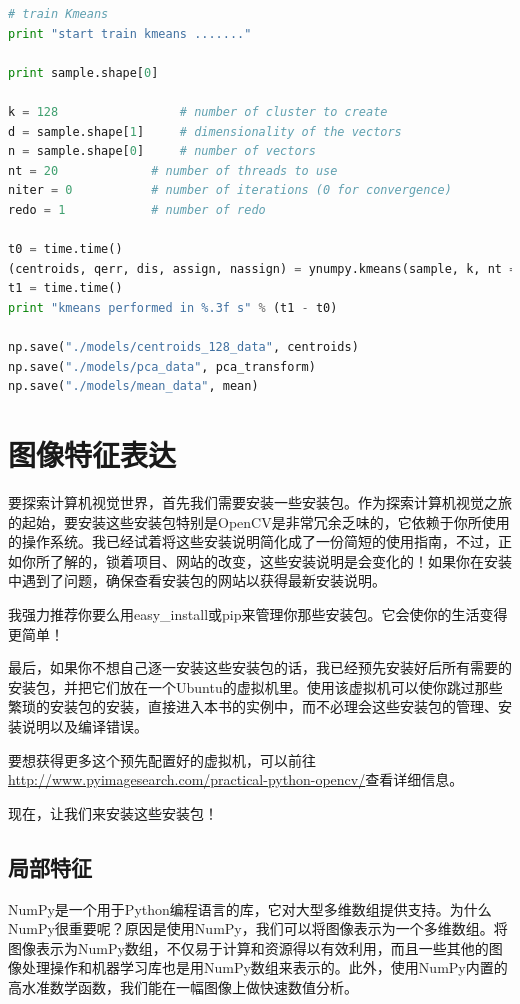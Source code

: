\documentclass[color=cyan,mathpazo,titlestyle=hang]{elegantbook}
\begin{document}
\begin{lstlisting}[language=python]
# train Kmeans
print "start train kmeans ......."

print sample.shape[0]

k = 128                 # number of cluster to create
d = sample.shape[1]     # dimensionality of the vectors
n = sample.shape[0]     # number of vectors
nt = 20             # number of threads to use
niter = 0           # number of iterations (0 for convergence)
redo = 1            # number of redo

t0 = time.time()
(centroids, qerr, dis, assign, nassign) = ynumpy.kmeans(sample, k, nt = nt, niter = niter, redo = redo, output = 'full')
t1 = time.time()
print "kmeans performed in %.3f s" % (t1 - t0)

np.save("./models/centroids_128_data", centroids)
np.save("./models/pca_data", pca_transform)
np.save("./models/mean_data", mean)
\end{lstlisting}

\chapter{图像特征表达}

要探索计算机视觉世界，首先我们需要安装一些安装包。作为探索计算机视觉之旅的起始，要安装这些安装包特别是OpenCV是非常冗余乏味的，它依赖于你所使用的操作系统。我已经试着将这些安装说明简化成了一份简短的使用指南，不过，正如你所了解的，锁着项目、网站的改变，这些安装说明是会变化的！如果你在安装中遇到了问题，确保查看安装包的网站以获得最新安装说明。

我强力推荐你要么用easy\_install或pip来管理你那些安装包。它会使你的生活变得更简单！

最后，如果你不想自己逐一安装这些安装包的话，我已经预先安装好后所有需要的安装包，并把它们放在一个Ubuntu的虚拟机里。使用该虚拟机可以使你跳过那些繁琐的安装包的安装，直接进入本书的实例中，而不必理会这些安装包的管理、安装说明以及编译错误。

要想获得更多这个预先配置好的虚拟机，可以前往\url{http://www.pyimagesearch.com/practical-python-opencv/}查看详细信息。

现在，让我们来安装这些安装包！

\section{局部特征}

NumPy是一个用于Python编程语言的库，它对大型多维数组提供支持。为什么NumPy很重要呢？原因是使用NumPy，我们可以将图像表示为一个多维数组。将图像表示为NumPy数组，不仅易于计算和资源得以有效利用，而且一些其他的图像处理操作和机器学习库也是用NumPy数组来表示的。此外，使用NumPy内置的高水准数学函数，我们能在一幅图像上做快速数值分析。
\end{document}
